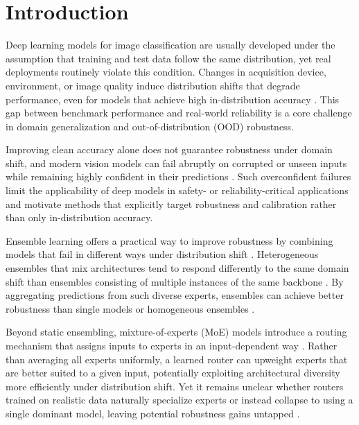 \section{Introduction}
\label{intro}

Deep learning models for image classification are usually developed under the assumption that training and test data follow the same distribution, yet real deployments routinely violate this condition.
Changes in acquisition device, environment, or image quality induce distribution shifts that degrade performance, even for models that achieve high in-distribution accuracy \citep{quinonero-candelaDatasetShiftMachine2008}.
This gap between benchmark performance and real-world reliability is a core challenge in domain generalization and out-of-distribution (OOD) robustness.

Improving clean accuracy alone does not guarantee robustness under domain shift, and modern vision models can fail abruptly on corrupted or unseen inputs while remaining highly confident in their predictions \citep{zhouDomainGeneralizationSurvey2023}.
Such overconfident failures limit the applicability of deep models in safety- or reliability-critical applications and motivate methods that explicitly target robustness and calibration rather than only in-distribution accuracy.

Ensemble learning offers a practical way to improve robustness by combining models that fail in different ways under distribution shift \citep{dietterichEnsembleMethodsMachine2000}.
Heterogeneous ensembles that mix architectures tend to respond differently to the same domain shift than ensembles consisting of multiple instances of the same backbone \citep{petrakovaHeterogeneousHomogeneousMachine2015}.
By aggregating predictions from such diverse experts, ensembles can achieve better robustness than single models or homogeneous ensembles \citep{wuExploringModelLearning2023}.

Beyond static ensembling, mixture-of-experts (MoE) models introduce a routing mechanism that assigns inputs to experts in an input-dependent way \citep{masoudniaMixtureExpertsLiterature2014}.
Rather than averaging all experts uniformly, a learned router can upweight experts that are better suited to a given input, potentially exploiting architectural diversity more efficiently under distribution shift.
Yet it remains unclear whether routers trained on realistic data naturally specialize experts or instead collapse to using a single dominant model, leaving potential robustness gains untapped \citep{fedusSwitchTransformersScaling2021}.

